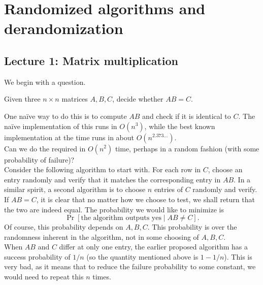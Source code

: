 \section{Randomized algorithms and derandomization}

	\subsection{Lecture 1: Matrix multiplication}

		We begin with a question.

		\begin{problem*}
			Given three $n\times n$ matrices $A,B,C$, decide whether $AB = C$. 
		\end{problem*}

		One na\"{i}ve way to do this is to compute $AB$ and check if it is identical to $C$. The na\"{i}ve implementation of this runs in $O(n^3)$, while the best known implementation at the time runs in about $O(n^{2.373\ldots})$. \\
		Can we do the required in $O(n^2)$ time, perhaps in a random fashion (with some probability of failure)?\\

		Consider the following algorithm to start with. For each row in $C$, choose an entry randomly and verify that it matches the corresponding entry in $AB$. In a similar spirit, a second algorithm is to choose $n$ entries of $C$ randomly and verify.\\

		If $AB = C$, it is clear that no matter how we choose to test, we shall return that the two are indeed equal. The probability we would like to minimize is
		\[ \Pr[\text{the algorithm outputs yes} \mid AB \ne C]. \]
		Of course, this probability depends on $A,B,C$. This probability is over the randomness inherent in the algorithm, not in some choosing of $A,B,C$. \\

		When $AB$ and $C$ differ at only one entry, the earlier proposed algorithm has a success probability of $1/n$ (so the quantity mentioned above is $1-1/n$). This is very bad, as it means that to reduce the failure probability to some constant, we would need to repeat this $n$ times.\\

